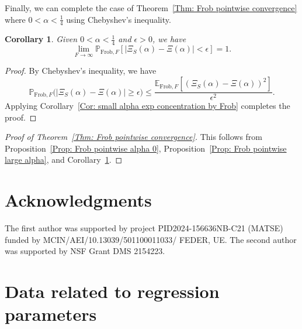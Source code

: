 \documentclass[12pt]{amsart}
\def\E{{\mathbb E}}
\renewcommand{\P}{\mathbb{P}}
\newcommand{\Frob}{\text{Frob}}
\newtheorem{corollary}[theorem]{Corollary}
\begin{document}
Finally, we can complete the case of Theorem~\ref{Thm: Frob pointwise convergence} where $0<\alpha<\frac{1}{4}$ using Chebyshev's inequality.

\begin{corollary}\label{Cor: pointwise small alpha by Frob}
Given $0<\alpha<\frac{1}{4}$ and $\epsilon>0$, we have
\[
\lim_{F\to\infty} \P_{\Frob,F}[ |\Xi_S(\alpha) -\Xi(\alpha)|<\epsilon ] =1.
\]
\end{corollary}
\begin{proof}
By Chebyshev's inequality, we have
\[
\P_{\Frob,F}\big(|\Xi_S(\alpha)-\Xi(\alpha)|\geq \epsilon\big)
\leq \frac{\E_{\Frob,F}[(\Xi_S(\alpha)-\Xi(\alpha))^2]}{\epsilon^2}.
\]
Applying Corollary~\ref{Cor: small alpha exp concentration by Frob} completes the proof.
\end{proof}


\begin{proof}[Proof of Theorem~\ref{Thm: Frob pointwise convergence}]
This follows from Proposition~\ref{Prop: Frob pointwise alpha 0}, Proposition~\ref{Prop: Frob pointwise large alpha}, and Corollary~\ref{Cor: pointwise small alpha by Frob}.
\end{proof}











\section*{Acknowledgments}
The first author was supported by project PID2024-156636NB-C21 (MATSE) funded by MCIN/AEI/10.13039/501100011033/ FEDER, UE.
The second author was supported by NSF Grant DMS 2154223.


\appendix
\section{Data related to regression parameters}\label{sec:appendix}

\vspace{-.3in}
\end{document}
